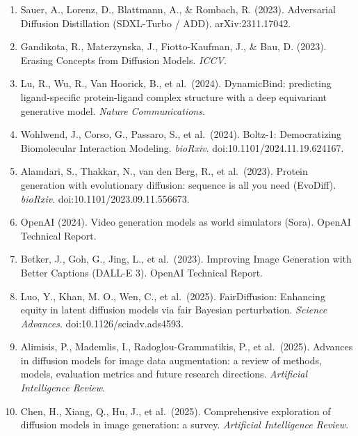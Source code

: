 \begin{enumerate}
  Karras, T., Aittala, M., Lehtinen, J., Hellsten, J., Aila, T., \& Laine, S. (2024). Analyzing and Improving the Training Dynamics of Diffusion Models (EDM2). \emph{CVPR}.
\item
  Sauer, A., Lorenz, D., Blattmann, A., \& Rombach, R. (2023). Adversarial Diffusion Distillation (SDXL-Turbo / ADD). arXiv:2311.17042.
\item
  Gandikota, R., Materzynska, J., Fiotto-Kaufman, J., \& Bau, D. (2023). Erasing Concepts from Diffusion Models. \emph{ICCV}.
\item
  Lu, R., Wu, R., Van Hoorick, B., et al.~(2024). DynamicBind: predicting ligand-specific protein-ligand complex structure with a deep equivariant generative model. \emph{Nature Communications}.
\item
  Wohlwend, J., Corso, G., Passaro, S., et al.~(2024). Boltz-1: Democratizing Biomolecular Interaction Modeling. \emph{bioRxiv}. doi:10.1101/2024.11.19.624167.
\item
  Alamdari, S., Thakkar, N., van den Berg, R., et al.~(2023). Protein generation with evolutionary diffusion: sequence is all you need (EvoDiff). \emph{bioRxiv}. doi:10.1101/2023.09.11.556673.
\item
  OpenAI (2024). Video generation models as world simulators (Sora). OpenAI Technical Report.
\item
  Betker, J., Goh, G., Jing, L., et al.~(2023). Improving Image Generation with Better Captions (DALL-E 3). OpenAI Technical Report.
\item
  Luo, Y., Khan, M. O., Wen, C., et al.~(2025). FairDiffusion: Enhancing equity in latent diffusion models via fair Bayesian perturbation. \emph{Science Advances}. doi:10.1126/sciadv.ads4593.
\item
  Alimisis, P., Mademlis, I., Radoglou-Grammatikis, P., et al.~(2025). Advances in diffusion models for image data augmentation: a review of methods, models, evaluation metrics and future research directions. \emph{Artificial Intelligence Review}.
\item
  Chen, H., Xiang, Q., Hu, J., et al.~(2025). Comprehensive exploration of diffusion models in image generation: a survey. \emph{Artificial Intelligence Review}.
\end{enumerate}
